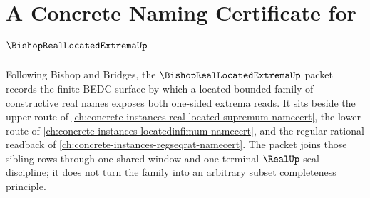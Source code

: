 \chapter{A Concrete Naming Certificate for $\BishopRealLocatedExtremaUp$}
\label{ch:concrete-instances-bishop-real-located-extrema-namecert}

Following Bishop and Bridges, the $\BishopRealLocatedExtremaUp$ packet records the finite BEDC surface by which a located bounded family of constructive real names exposes both one-sided extrema reads. It sits beside the upper route of \autoref{ch:concrete-instances-real-located-supremum-namecert}, the lower route of \autoref{ch:concrete-instances-locatedinfimum-namecert}, and the regular rational readback of \autoref{ch:concrete-instances-regseqrat-namecert}. The packet joins those sibling rows through one shared window and one terminal $\RealUp$ seal discipline; it does not turn the family into an arbitrary subset completeness principle.

